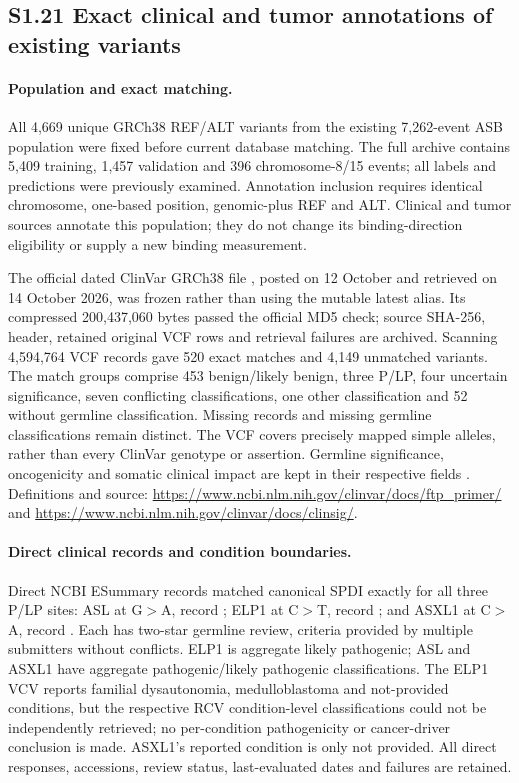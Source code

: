 \subsection*{S1.21 Exact clinical and tumor annotations of existing variants}

\paragraph{Population and exact matching.} All 4,669 unique GRCh38 REF/ALT variants from the existing 7,262-event ASB population were fixed before current database matching. The full archive contains 5,409 training, 1,457 validation and 396 chromosome-8/15 events; all labels and predictions were previously examined. Annotation inclusion requires identical chromosome, one-based position, genomic-plus REF and ALT. Clinical and tumor sources annotate this population; they do not change its binding-direction eligibility or supply a new binding measurement.

The official dated ClinVar GRCh38 file , posted on 12 October and retrieved on 14 October 2026, was frozen rather than using the mutable latest alias. Its compressed 200,437,060 bytes passed the official MD5 check; source SHA-256, header, retained original VCF rows and retrieval failures are archived. Scanning 4,594,764 VCF records gave 520 exact matches and 4,149 unmatched variants. The match groups comprise 453 benign/likely benign, three P/LP, four uncertain significance, seven conflicting classifications, one other classification and 52 without germline classification. Missing records and missing germline classifications remain distinct. The VCF covers precisely mapped simple alleles, rather than every ClinVar genotype or assertion. Germline significance, oncogenicity and somatic clinical impact are kept in their respective fields \citep{landrum2018clinvar}. Definitions and source: \url{https://www.ncbi.nlm.nih.gov/clinvar/docs/ftp_primer/} and \url{https://www.ncbi.nlm.nih.gov/clinvar/docs/clinsig/}.

\paragraph{Direct clinical records and condition boundaries.} Direct NCBI ESummary records matched canonical SPDI exactly for all three P/LP sites: ASL at  G$>$A, record ; ELP1 at  C$>$T, record ; and ASXL1 at  C$>$A, record . Each has two-star germline review, criteria provided by multiple submitters without conflicts. ELP1 is aggregate likely pathogenic; ASL and ASXL1 have aggregate pathogenic/likely pathogenic classifications. The ELP1 VCV reports familial dysautonomia, medulloblastoma and not-provided conditions, but the respective RCV condition-level classifications could not be independently retrieved; no per-condition pathogenicity or cancer-driver conclusion is made. ASXL1's reported condition is only not provided. All direct responses, accessions, review status, last-evaluated dates and failures are retained.

